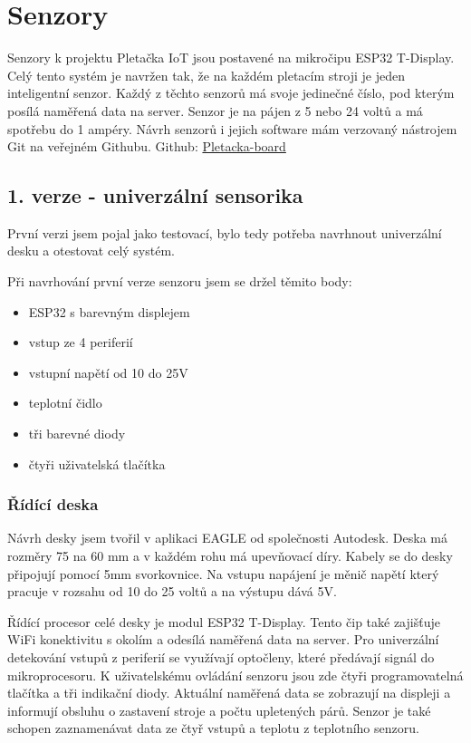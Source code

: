 \chapter{Senzory}

Senzory k projektu Pletačka IoT jsou postavené na mikročipu ESP32 T-Display.
Celý tento systém je navržen tak, že na každém pletacím stroji je jeden inteligentní senzor.
Každý z těchto senzorů má svoje jedinečné číslo, pod kterým posílá naměřená data na server.
Senzor je na pájen z 5 nebo 24 voltů a má spotřebu do 1 ampéry.
Návrh senzorů i jejich software mám verzovaný nástrojem Git na veřejném Githubu.\newline
Github: \href{https://github.com/Pletacka-IoT/Pletacka-board}{Pletacka-board}\cite{PL_BOARD}

\section{1. verze - univerzální sensorika}

První verzi jsem pojal jako testovací, bylo tedy potřeba navrhnout univerzální desku a otestovat celý systém.\newline

Při navrhování první verze senzoru jsem se držel těmito body:
\begin{itemize}
    \item ESP32 s barevným displejem
    \item vstup ze 4 periferií
    \item vstupní napětí od 10 do 25V
    \item teplotní čidlo
    \item tři barevné diody
    \item čtyři uživatelská tlačítka
\end{itemize}


\subsection{Řídící deska}
Návrh desky jsem tvořil v aplikaci EAGLE od společnosti Autodesk. 
Deska má rozměry 75 na 60 mm a v každém rohu má upevňovací díry. 
Kabely se do desky připojují pomocí 5mm svorkovnice.
Na vstupu napájení je měnič napětí který pracuje v rozsahu od 10 do 25 voltů a na výstupu dává 5V. 

Řídící procesor celé desky je modul ESP32 T-Display.
Tento čip také zajišťuje WiFi konektivitu s okolím a odesílá naměřená data na server.
Pro univerzální detekování vstupů z periferií se využívají optočleny, které předávají signál do mikroprocesoru.
K uživatelskému ovládání senzoru jsou zde čtyři programovatelná tlačítka a tři indikační diody.
Aktuální naměřená data se zobrazují na displeji a informují obsluhu o zastavení stroje a počtu upletených párů.
Senzor je také schopen zaznamenávat data ze čtyř vstupů a teplotu z teplotního senzoru.

